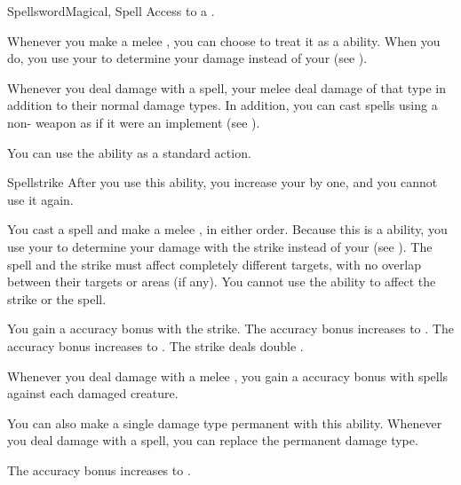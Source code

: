     \begin{magicalfeat}{Spellsword}{Magical, Spell}
        \featpre Access to a .

         Whenever you make a melee , you can choose to treat it as a \magical ability.
        When you do, you use your  to determine your damage instead of your  (see ).

         Whenever you deal damage with a spell, your melee   deal damage of that type in addition to their normal damage types.
        In addition, you can cast spells using a non- weapon as if it were an implement (see ).

         You can use the  ability as a standard action.
        \begin{magicalactiveability}{Spellstrike}
            \rankline
            After you use this ability, you increase your  by one, and you  cannot use it again.

            You cast a spell and make a melee , in either order.
            Because this is a \magical ability, you use your  to determine your damage with the strike instead of your  (see ).
            The spell and the strike must affect completely different targets, with no overlap between their targets or areas (if any).
            You cannot use the  ability to affect the strike or the spell.

            \rankline
             You gain a  accuracy bonus with the strike.
             The accuracy bonus increases to .
             The accuracy bonus increases to .
             The strike deals double .
        \end{magicalactiveability}

         Whenever you deal damage with a melee , you  gain a  accuracy bonus with spells against each damaged creature.

         You can also make a single damage type permanent with this ability.
        Whenever you deal damage with a spell, you can replace the permanent damage type.

         The accuracy bonus increases to .
    \end{magicalfeat}

